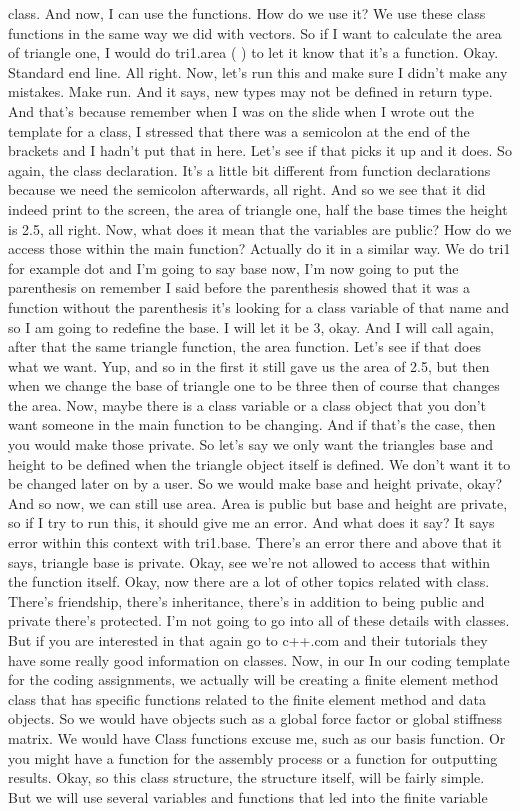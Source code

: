\documentclass[10pt]{article}
\begin{document}
class. And now, I can use the functions. How do we use it? We use these class functions in the same way we did with vectors. So if I want to calculate the area of triangle one, I would do tri1.area ( ) to let it know that it's a function. Okay. Standard end line. All right. Now, let's run this and make sure I didn't make any mistakes. Make run. And it says, new types may not be defined in return type. And that's because remember when I was on the slide when I wrote out the template for a class, I stressed that there was a semicolon at the end of the brackets and I hadn't put that in here. Let's see if that picks it up and it does. So again, the class declaration. It's a little bit different from function declarations because we need the semicolon afterwards, all right. And so we see that it did indeed print to the screen, the area of triangle one, half the base times the height is 2.5, all right. Now, what does it mean that the variables are public? How do we access those within the main function? Actually do it in a similar way. We do tri1 for example dot and I'm going to say base now, I'm now going to put the parenthesis on remember I said before the parenthesis showed that it was a function without the parenthesis it's looking for a class variable of that name and so I am going to redefine the base. I will let it be 3, okay. And I will call again, after that the same triangle function, the area function. Let's see if that does what we want. Yup, and so in the first it still gave us the area of 2.5, but then when we change the base of triangle one to be three then of course that changes the area. Now, maybe there is a class variable or a class object that you don't want someone in the main function to be changing. And if that's the case, then you would make those private. So let's say we only want the triangles base and height to be defined when the triangle object itself is defined. We don't want it to be changed later on by a user. So we would make base and height private, okay? And so now, we can still use area. Area is public but base and height are private, so if I try to run this, it should give me an error. And what does it say? It says error within this context with tri1.base. There's an error there and above that it says, triangle base is private. Okay, see we're not allowed to access that within the function itself. Okay, now there are a lot of other topics related with class. There's friendship, there's inheritance, there's in addition to being public and private there's protected. I'm not going to go into all of these details with classes. But if you are interested in that again go to c++.com and their tutorials they have some really good information on classes. Now, in our In our coding template for the coding assignments, we actually will be creating a finite element method class that has specific functions related to the finite element method and data objects. So we would have objects such as a global force factor or global stiffness matrix. We would have Class functions excuse me, such as our basis function. Or you might have a function for the assembly process or a function for outputting results. Okay, so this class structure, the structure itself, will be fairly simple. But we will use several variables and functions that led into the finite variable 
\end{document}
